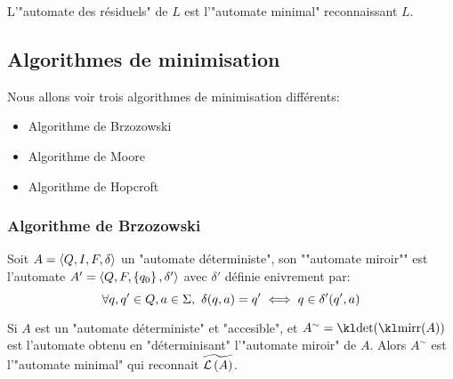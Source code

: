 L'"automate des résiduels" de $L$ est l'"automate minimal" reconnaissant $L$.

\subsection{Algorithmes de minimisation}


Nous allons voir trois algorithmes de minimisation différents:
\begin{itemize}
	\item Algorithme de Brzozowski
	\item Algorithme de Moore
	\item Algorithme de Hopcroft
\end{itemize}


\subsubsection{Algorithme de Brzozowski}


\begin{definition}
	Soit $A = \langle Q, I, F, \delta \rangle$ un "automate déterministe", son ""automate miroir"" est l'automate $A' = \langle Q, F, \left\{q_0\right\}, \delta' \rangle$ avec
	$\delta'$ définie enivrement par:
	$$\forall q,q' \in Q, a \in \Sigma, \ \delta(q,a) = q' \iff q \in \delta'(q',a)$$
\end{definition}


\begin{prop}
	Si $A$ est un "automate déterministe" et "accesible", et  $A^ {\sim} = \detA (\mirr(A)) $ est l'automate
	obtenu en "déterminisant" l'"automate miroir" de $A$. Alors $A^{\sim}$ est l'"automate minimal" qui
	reconnait $\widetilde{\mathcal{L}\left(A\right)}$.
\end{prop}



